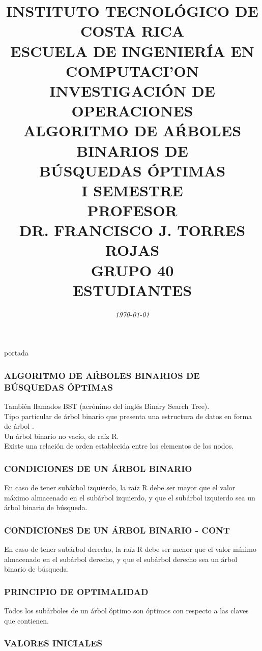 \documentclass[10]{beamer}
\title{{\color{WHITE} \large \textbf{INSTITUTO TECNOL\'OGICO DE COSTA RICA}} \\ \vspace{0.02cm} 
{\color{WHITE} \large \textbf{ESCUELA DE INGENIER\'IA EN COMPUTACI'ON }} \\ \vspace{0.02cm} 
{\color{WHITE} \large \textbf{INVESTIGACI\'ON DE OPERACIONES  }} \\ \vspace{0.02cm} 
{\color{WHITE} \large \textbf{ALGORITMO DE A\'RBOLES BINARIOS DE \\ B\'USQUEDAS \'OPTIMAS  }} \\ \vspace{0.02cm} 
{\color{WHITE} \large \textbf{I SEMESTRE  }}\\ \vspace{0.02cm}
{\color{WHITE} \large \textbf{PROFESOR}} \\ \vspace{0.02cm}
{\color{WHITE} \large DR. FRANCISCO J. TORRES ROJAS  } \\ \vspace{0.02cm}
{\color{WHITE} \large \textbf{GRUPO 40}} \\ \vspace{0.01cm}
{\color{WHITE} \large \textbf{ESTUDIANTES} }}
\date{\em \color{WHITE} \today}
\begin{document}
\begin{frame}
\color{white}
\titlepage portada
\end{frame} 
\begin{frame}
\color{white}
\frametitle{ALGORITMO DE A\'RBOLES BINARIOS DE B\'USQUEDAS \'OPTIMAS}
Tambi\'en llamados BST (acr\'onimo del ingl\'es Binary Search Tree).
\\ Tipo particular de \'arbol binario que presenta una estructura de datos en forma de \'arbol .
\\Un \'arbol binario no vac\'io, de ra\'iz R.
\\ Existe una relaci\'on de orden establecida entre los elementos de los nodos.
\end{frame} 
\begin{frame}
\color{white}
\frametitle{CONDICIONES DE UN \'ARBOL BINARIO}
En caso de tener sub\'arbol izquierdo, la ra\'iz R debe ser mayor que el valor m\'aximo almacenado en el sub\'arbol izquierdo, y que el sub\'arbol izquierdo sea un \'arbol binario de b\'usqueda.
\end{frame} 
\begin{frame}
\color{white}
\frametitle{CONDICIONES DE UN \'ARBOL BINARIO - CONT}
En caso de tener sub\'arbol derecho, la ra\'iz R debe ser menor que el valor m\'inimo almacenado en el sub\'arbol derecho, y que el sub\'arbol derecho sea un \'arbol binario de b\'usqueda.
\end{frame} 
\begin{frame}
\color{white}
\frametitle{PRINCIPIO DE OPTIMALIDAD}
Todos los sub\'arboles de un \'arbol \'optimo son \'optimos con respecto a las claves que contienen.
\end{frame} 
\begin{frame}\frametitle{VALORES INICIALES}
 \color{white}
\end{frame} 
\end{document}
